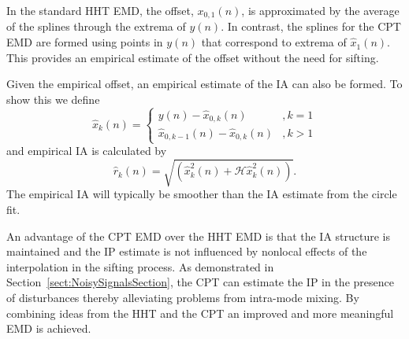 \documentclass[a4paper]{IEEEtran}
\begin{document}
In the standard HHT EMD, the offset, $x_{0,1}(n)$, is approximated by the average of the splines through the extrema of $y(n)$. In contrast, the splines for the CPT EMD are formed using points in $y(n)$ that correspond to extrema of $\hat{x}_1(n)$. This provides an empirical estimate of the offset without the need for sifting. 

Given the empirical offset, an empirical estimate of the IA can also be formed. To show this we define
\begin{equation}
	\hat{x}_k(n) = \left\{ \begin{array}{ll}
		y(n)-\hat{x}_{0,k}(n) & , k=1 \\
		\hat{x}_{0,k-1}(n)-\hat{x}_{0,k}(n) & , k>1 
		\end{array}\right.
\end{equation}
and empirical IA is calculated by
\begin{equation}
	\hat{r}_k(n) = \sqrt{(\hat{x}^2_k(n) + \mathcal{H}\hat{x}^2_k(n))}.
\end{equation} 
The empirical IA will typically be smoother than the IA estimate from the circle fit. 
 
An advantage of the CPT EMD over the HHT EMD is that the IA structure is maintained and the IP estimate is not influenced by nonlocal effects of the interpolation in the sifting process. As demonstrated in Section~\ref{sect:NoisySignalsSection}, the CPT can estimate the IP in the presence of disturbances thereby alleviating problems from intra-mode mixing. By combining ideas from the HHT and the CPT an improved and more meaningful EMD is achieved. %
% 


\end{document}
